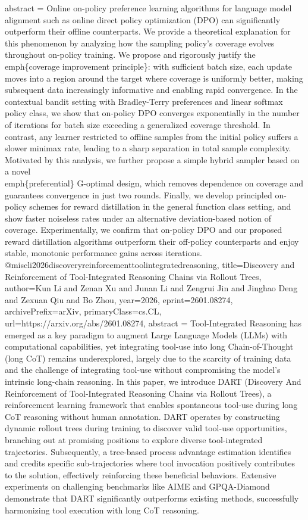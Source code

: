 {      abstract = {Online on-policy preference learning algorithms for language model alignment such as online direct policy optimization (DPO) can significantly outperform their offline counterparts. We provide a theoretical explanation for this phenomenon by analyzing how the sampling policy's coverage evolves throughout on-policy training. We propose and rigorously justify the \\emph\{coverage improvement principle\}: with sufficient batch size, each update moves into a region around the target where coverage is uniformly better, making subsequent data increasingly informative and enabling rapid convergence. In the contextual bandit setting with Bradley-Terry preferences and linear softmax policy class, we show that on-policy DPO converges exponentially in the number of iterations for batch size exceeding a generalized coverage threshold. In contrast, any learner restricted to offline samples from the initial policy suffers a slower minimax rate, leading to a sharp separation in total sample complexity. Motivated by this analysis, we further propose a simple hybrid sampler based on a novel \\emph\{preferential\} G-optimal design, which removes dependence on coverage and guarantees convergence in just two rounds. Finally, we develop principled on-policy schemes for reward distillation in the general function class setting, and show faster noiseless rates under an alternative deviation-based notion of coverage. Experimentally, we confirm that on-policy DPO and our proposed reward distillation algorithms outperform their off-policy counterparts and enjoy stable, monotonic performance gains across iterations.}
}@misc{li2026discoveryreinforcementtoolintegratedreasoning,
      title={Discovery and Reinforcement of Tool-Integrated Reasoning Chains via Rollout Trees}, 
      author={Kun Li and Zenan Xu and Junan Li and Zengrui Jin and Jinghao Deng and Zexuan Qiu and Bo Zhou},
      year={2026},
      eprint={2601.08274},
      archivePrefix={arXiv},
      primaryClass={cs.CL},
      url={https://arxiv.org/abs/2601.08274},
      abstract = {Tool-Integrated Reasoning has emerged as a key paradigm to augment Large Language Models (LLMs) with computational capabilities, yet integrating tool-use into long Chain-of-Thought (long CoT) remains underexplored, largely due to the scarcity of training data and the challenge of integrating tool-use without compromising the model's intrinsic long-chain reasoning. In this paper, we introduce DART (Discovery And Reinforcement of Tool-Integrated Reasoning Chains via Rollout Trees), a reinforcement learning framework that enables spontaneous tool-use during long CoT reasoning without human annotation. DART operates by constructing dynamic rollout trees during training to discover valid tool-use opportunities, branching out at promising positions to explore diverse tool-integrated trajectories. Subsequently, a tree-based process advantage estimation identifies and credits specific sub-trajectories where tool invocation positively contributes to the solution, effectively reinforcing these beneficial behaviors. Extensive experiments on challenging benchmarks like AIME and GPQA-Diamond demonstrate that DART significantly outperforms existing methods, successfully harmonizing tool execution with long CoT reasoning.}
}
